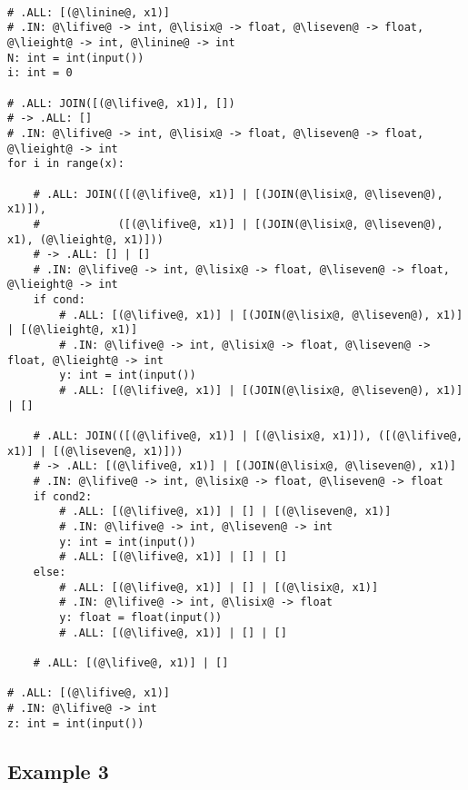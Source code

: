 \documentclass[11pt]{article}
\begin{document}
\begin{lstlisting}

# .ALL: [(@\linine@, x1)]
# .IN: @\lifive@ -> int, @\lisix@ -> float, @\liseven@ -> float, @\lieight@ -> int, @\linine@ -> int
N: int = int(input())
i: int = 0

# .ALL: JOIN([(@\lifive@, x1)], [])
# -> .ALL: []
# .IN: @\lifive@ -> int, @\lisix@ -> float, @\liseven@ -> float, @\lieight@ -> int
for i in range(x):

    # .ALL: JOIN(([(@\lifive@, x1)] | [(JOIN(@\lisix@, @\liseven@), x1)]), 
    #            ([(@\lifive@, x1)] | [(JOIN(@\lisix@, @\liseven@), x1), (@\lieight@, x1)]))
    # -> .ALL: [] | []
    # .IN: @\lifive@ -> int, @\lisix@ -> float, @\liseven@ -> float, @\lieight@ -> int
    if cond:
        # .ALL: [(@\lifive@, x1)] | [(JOIN(@\lisix@, @\liseven@), x1)] | [(@\lieight@, x1)]
        # .IN: @\lifive@ -> int, @\lisix@ -> float, @\liseven@ -> float, @\lieight@ -> int
        y: int = int(input())
        # .ALL: [(@\lifive@, x1)] | [(JOIN(@\lisix@, @\liseven@), x1)] | []

    # .ALL: JOIN(([(@\lifive@, x1)] | [(@\lisix@, x1)]), ([(@\lifive@, x1)] | [(@\liseven@, x1)]))
    # -> .ALL: [(@\lifive@, x1)] | [(JOIN(@\lisix@, @\liseven@), x1)]
    # .IN: @\lifive@ -> int, @\lisix@ -> float, @\liseven@ -> float
    if cond2:
        # .ALL: [(@\lifive@, x1)] | [] | [(@\liseven@, x1)]
        # .IN: @\lifive@ -> int, @\liseven@ -> int
        y: int = int(input())
        # .ALL: [(@\lifive@, x1)] | [] | []
    else:
        # .ALL: [(@\lifive@, x1)] | [] | [(@\lisix@, x1)]
        # .IN: @\lifive@ -> int, @\lisix@ -> float
        y: float = float(input())
        # .ALL: [(@\lifive@, x1)] | [] | []
    
    # .ALL: [(@\lifive@, x1)] | []
    
# .ALL: [(@\lifive@, x1)]
# .IN: @\lifive@ -> int
z: int = int(input())
\end{lstlisting}

\newpage

\subsection{Example 3}

\end{document}
